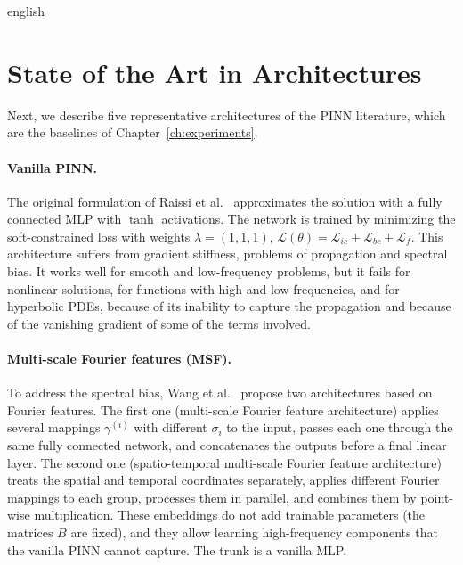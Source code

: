 \documentclass[11pt,letterpaper,twoside,openright]{book} %
\newcommand{\Loss}{\mathcal{L}}
\begin{document}
\begin{hyphenrules}{english}
\section{State of the Art in Architectures}\label{sec:architectures}

Next, we describe five representative architectures of the PINN literature, which are the baselines of
Chapter~\ref{ch:experiments}.

\paragraph{Vanilla PINN.}
The original formulation of Raissi et al.~\cite{raissi2019} approximates the solution with a fully connected MLP
with $\tanh$ activations. The network is trained by minimizing the soft-constrained loss with weights
$\lambda=(1,1,1)$, $\Loss(\theta)=\Loss_{ic}+\Loss_{bc}+\Loss_f$. This architecture suffers from gradient
stiffness, problems of propagation and spectral bias. It works well for smooth and low-frequency
problems, but it fails for nonlinear solutions, for functions with high and low frequencies, and for
hyperbolic PDEs, because of its inability to capture the propagation and because of the vanishing gradient
of some of the terms involved.

\paragraph{Multi-scale Fourier features (MSF).}
To address the spectral bias, Wang et al.~\cite{wang2021eigenvector} propose two architectures based on Fourier
features. The first one (multi-scale Fourier feature architecture) applies several mappings
$\gamma^{(i)}$ with different $\sigma_i$ to the input, passes each one through the same fully connected
network, and concatenates the outputs before a final linear layer. The second one (spatio-temporal
multi-scale Fourier feature architecture) treats the spatial and temporal coordinates separately, applies
different Fourier mappings to each group, processes them in parallel, and combines them by point-wise
multiplication. These embeddings do not add trainable parameters (the matrices $B$ are fixed), and they
allow learning high-frequency components that the vanilla PINN cannot capture. The trunk is a vanilla MLP.


\end{hyphenrules}
\end{document}
